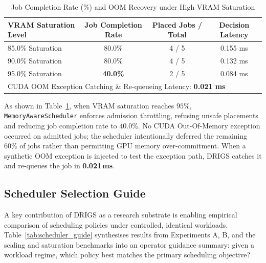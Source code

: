 \begin{table}[htbp]
\centering
\caption{Job Completion Rate (\%) and OOM Recovery under High VRAM Saturation}
\label{tab:vram_saturation}
\begin{tabular}{lccc}
\toprule
\textbf{VRAM Saturation Level} & \textbf{Job Completion Rate} & \textbf{Placed Jobs / Total} & \textbf{Decision Latency} \\
\midrule
85.0\% Saturation & 80.0\% & 4 / 5 & 0.155 ms \\
90.0\% Saturation & 80.0\% & 4 / 5 & 0.132 ms \\
95.0\% Saturation & \textbf{40.0\%} & 2 / 5 & 0.084 ms \\
\midrule
\multicolumn{4}{l}{CUDA OOM Exception Catching \& Re-queueing Latency: \textbf{0.021 ms}} \\
\bottomrule
\end{tabular}
\end{table}

As shown in Table~\ref{tab:vram_saturation}, when VRAM saturation reaches $95\%$, \texttt{MemoryAwareScheduler} enforces admission throttling, refusing unsafe placements and reducing job completion rate to $40.0\%$. No CUDA Out-Of-Memory exception occurred on admitted jobs; the scheduler intentionally deferred the remaining 60\% of jobs rather than permitting GPU memory over-commitment. When a synthetic OOM exception is injected to test the exception path, DRIGS catches it and re-queues the job in \textbf{0.021\,ms}.

\subsection{Scheduler Selection Guide}

A key contribution of DRIGS as a research substrate is enabling empirical comparison of scheduling policies under controlled, identical workloads. Table~\ref{tab:scheduler_guide} synthesises results from Experiments A, B, and the scaling and saturation benchmarks into an operator guidance summary: given a workload regime, which policy best matches the primary scheduling objective?

